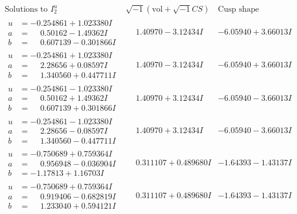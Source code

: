 \documentclass[1p]{elsarticle_modified}
\theoremstyle{definition}
\newcommand{\I}{\sqrt{-1}}
\begin{document}
$$\begin{array}{c|c|c}  
\text{Solutions to }I^u_{2}& \I (\text{vol} + \sqrt{-1}CS) & \text{Cusp shape}\\
 \hline 
\begin{aligned}
u &= -0.254861 + 1.023380 I \\
a &= \phantom{-}0.50162 - 1.49362 I \\
b &= \phantom{-}0.607139 - 0.301866 I\end{aligned}
 & \phantom{-}1.40970 - 3.12434 I & -6.05940 + 3.66013 I \\ \hline\begin{aligned}
u &= -0.254861 + 1.023380 I \\
a &= \phantom{-}2.28656 + 0.08597 I \\
b &= \phantom{-}1.340560 + 0.447711 I\end{aligned}
 & \phantom{-}1.40970 - 3.12434 I & -6.05940 + 3.66013 I \\ \hline\begin{aligned}
u &= -0.254861 - 1.023380 I \\
a &= \phantom{-}0.50162 + 1.49362 I \\
b &= \phantom{-}0.607139 + 0.301866 I\end{aligned}
 & \phantom{-}1.40970 + 3.12434 I & -6.05940 - 3.66013 I \\ \hline\begin{aligned}
u &= -0.254861 - 1.023380 I \\
a &= \phantom{-}2.28656 - 0.08597 I \\
b &= \phantom{-}1.340560 - 0.447711 I\end{aligned}
 & \phantom{-}1.40970 + 3.12434 I & -6.05940 - 3.66013 I \\ \hline\begin{aligned}
u &= -0.750689 + 0.759364 I \\
a &= \phantom{-}0.956948 - 0.036904 I \\
b &= -1.17813 + 1.16703 I\end{aligned}
 & \phantom{-}0.311107 + 0.489680 I & -1.64393 - 1.43137 I \\ \hline\begin{aligned}
u &= -0.750689 + 0.759364 I \\
a &= \phantom{-}0.919406 - 0.682819 I \\
b &= \phantom{-}1.233040 + 0.594121 I\end{aligned}
 & \phantom{-}0.311107 + 0.489680 I & -1.64393 - 1.43137 I \\ \hline\begin{aligned}

\end{aligned}
\end{array}$$
\end{document}
